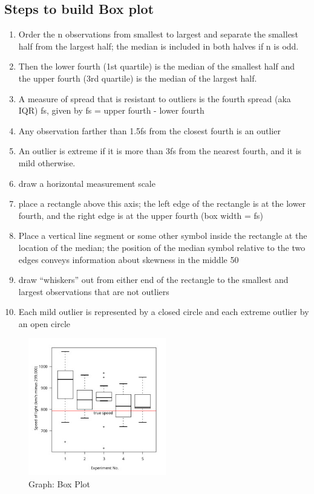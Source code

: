 \subsection{Steps to build Box plot}
\begin{enumerate}
    \item Order the n observations from smallest to largest and separate the smallest half from the largest half; the median is included in both halves if n is odd.
    \item Then the lower fourth (1st quartile) is the median of the smallest half and the upper fourth (3rd quartile) is the median of the largest half.
    \item A measure of spread that is resistant to outliers is the fourth spread (aka IQR) fs, given by fs = upper fourth - lower fourth
    \item Any observation farther than 1.5fs from the closest fourth is an outlier
    \item An outlier is extreme if it is more than 3fs from the nearest fourth, and it is mild otherwise.
    \item draw a horizontal measurement scale
    \item place a rectangle above this axis; the left edge of the rectangle is at the lower fourth, and the right edge is at the upper fourth (box width = fs)
    \item Place a vertical line segment or some other symbol inside the rectangle at the location of the median; the position of the median symbol relative to the two edges conveys information about skewness in the middle 50%
    \item draw “whiskers” out from either end of the rectangle to the smallest and largest observations that are not outliers
    \item Each mild outlier is represented by a closed circle and each extreme outlier by an open circle
\end{enumerate}

\begin{figure}[H]
    \centering
    \includegraphics[height=6cm]{Pictures/data/data_box-plot.jpg}
    \caption{Graph: Box Plot}
\end{figure}































